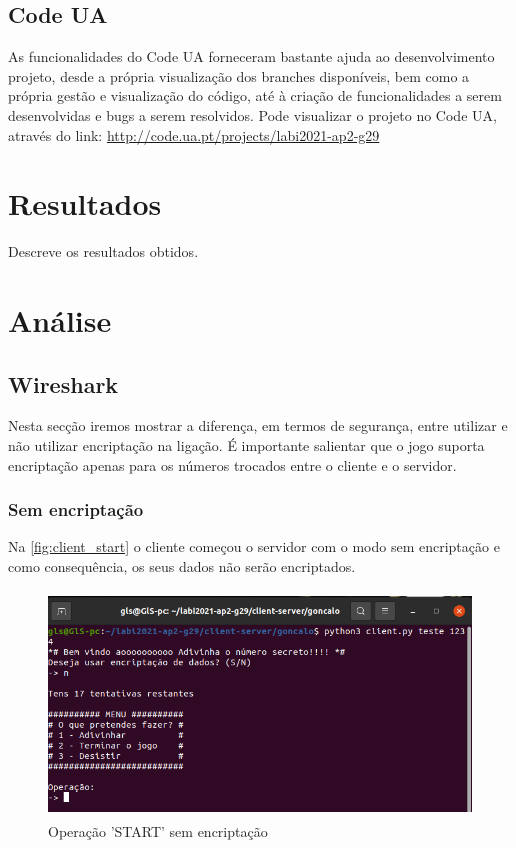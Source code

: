 \documentclass{report}
\begin{document}
\section{Code UA}
\label{sec:code_ua}
As funcionalidades do Code UA forneceram bastante ajuda ao desenvolvimento projeto, desde a própria visualização dos branches disponíveis, bem como a própria gestão e visualização do código, até à criação de funcionalidades a serem desenvolvidas e bugs a serem resolvidos. Pode visualizar o projeto no Code UA, através do link: \url{http://code.ua.pt/projects/labi2021-ap2-g29}


\chapter{Resultados}
\label{chap.resultados}
Descreve os resultados obtidos.

\chapter{Análise}
\label{chap.analise}

\section{Wireshark}
\label{sec:wireshark}
Nesta secção iremos mostrar a diferença, em termos de segurança, entre utilizar e não utilizar encriptação na ligação. É importante salientar que o jogo suporta encriptação apenas para os números trocados entre o cliente e o servidor.

\subsection{Sem encriptação}
\label{ssec:wireshark_decrypt}

Na \autoref{fig:client_start} o cliente começou o servidor com o modo sem encriptação e como consequência, os seus dados não serão encriptados.

\begin{figure}[!h]
\center 
\includegraphics[height=170pt]{img/non_encripted/client_start.png}
\caption{Operação 'START' sem encriptação}
\label{fig:client_start}
\end{figure}
\end{document}
